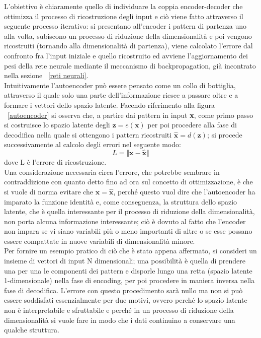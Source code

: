 L'obiettivo è chiaramente quello di individuare la coppia encoder-decoder che ottimizza il processo di ricostruzione degli input e ciò viene fatto attraverso il seguente processo iterativo: si presentano all'encoder i pattern di partenza uno alla volta, subiscono un processo di riduzione della dimensionalità e poi vengono ricostruiti (tornando alla dimensionalità di partenza), viene calcolato l'errore dal confronto fra l'input iniziale e quello ricostruito ed avviene l'aggiornamento dei pesi della rete neurale mediante il meccanismo di backpropagation, già incontrato nella sezione ~\ref{reti neurali}. \\
Intuitivamente l'autoencoder può essere pensato come un collo di bottiglia, attraverso il quale solo una parte dell'informazione riesce a passare oltre e a formare i vettori dello spazio latente.
Facendo riferimento alla figura ~\ref{autoencoder} si osserva che, a partire dai pattern in input \textbf{x}, come primo passo si costruisce lo spazio latente degli $\textbf{z} = e(\textbf{x})$ per poi procedere alla fase di decodifica nella quale si ottengono i pattern ricostruiti $\hat{\textbf{x}} = d(\textbf{z})$; si procede successivamente al calcolo degli errori nel seguente modo:
\begin{equation}
	L = \Vert \textbf{x} - \hat{\textbf{x}} \Vert
\end{equation}
dove L è l'errore di ricostruzione.\\
Una considerazione necessaria circa l'errore, che potrebbe sembrare in contraddizione con quanto detto fino ad ora sul concetto di ottimizzazione, è che si vuole di norma evitare che $\textbf{x} = \hat{\textbf{x}}$, perché questo vuol dire che l'autoencoder ha imparato la funzione identità e, come conseguenza, la struttura dello spazio latente, che è quella interessante per il processo di riduzione della dimensionalità, non porta alcuna informazione interessante; ciò è dovuto al fatto che l'encoder non impara se vi siano variabili più o meno importanti di altre o se esse possano essere compattate in nuove variabili di dimensionalità minore. \\
Per fornire un esempio pratico di ciò che è stato appena affermato, si consideri un insieme di vettori di input N dimensionali; una possibilità è quella di prendere una per una le componenti dei pattern e disporle lungo una retta (spazio latente 1-dimensionale) nella fase di encoding, per poi procedere in maniera inversa nella fase di decodifica. L'errore con questo procedimento sarà nullo ma non si può essere soddisfati essenzialmente per due motivi, ovvero perché lo spazio latente non è interpretabile e sfruttabile e perché in un processo di riduzione della dimensionalità si vuole fare in modo che i dati continuino a conservare una qualche struttura. \\
